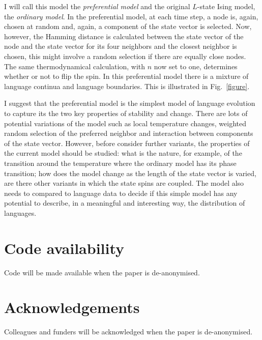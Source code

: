 \documentclass[letterpaper]{article}
\begin{document}
I will call this model the \textsl{preferential model} and the original $L$-state Ising model, the \textsl{ordinary model}. In the preferential model, at each time step, a node is, again, chosen at random and, again, a component of the state vector is selected. Now, however, the Hamming distance is calculated between the state vector of the node and the state vector for its four neighbors and the closest neighbor is chosen, this might involve a random selection if there are equally close nodes. The same thermodynamical calculation, with $n$ now set to one, determines whether or not to flip the spin. In this preferential model there is a mixture of language continua and language boundaries. This is illustrated in Fig.~\ref{figure}. 

I suggest that the preferential model is the simplest model of language evolution to capture its the two key properties of stability and change. There are lots of potential variations of the model such as local temperature changes, weighted random selection of the preferred neighbor and interaction between components of the state vector. However, before consider further variants, the properties of the current model should be studied: what is the nature, for example, of the transition around the temperature where the ordinary model has its phase transition; how does the model change as the length of the state vector is varied, are there other variants in which the state spins are coupled. The model also needs to compared to language data to decide if this simple model has any potential to describe, in a meaningful and interesting way, the distribution of languages. 

\section{Code availability}
Code will be made available when the paper is de-anonymised.
\section{Acknowledgements}
Colleagues and funders  will be acknowledged when the paper is de-anonymised.
\newpage
\footnotesize

\end{document}
